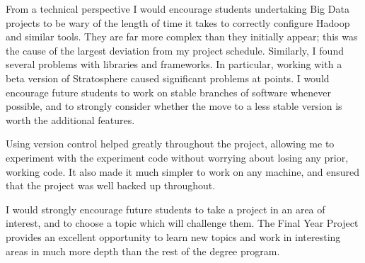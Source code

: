 From a technical perspective I would encourage students undertaking Big Data projects to be wary of the length of time it takes to correctly configure Hadoop and similar tools. They are far more complex than they initially appear; this was the cause of the largest deviation from my project schedule. Similarly, I found several problems with libraries and frameworks. In particular, working with a beta version of Stratosphere caused significant problems at points. I would encourage future students to work on stable branches of software whenever possible, and to strongly consider whether the move to a less stable version is worth the additional features.

Using version control helped greatly throughout the project, allowing me to experiment with the experiment code without worrying about losing any prior, working code. It also made it much simpler to work on any machine, and ensured that the project was well backed up throughout. 

I would strongly encourage future students to take a project in an area of interest, and to choose a topic which will challenge them. The Final Year Project provides an excellent opportunity to learn new topics and work in interesting areas in much more depth than the rest of the degree program.